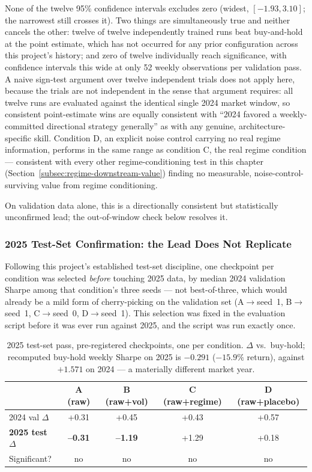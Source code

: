 None of the twelve 95\% confidence intervals excludes zero (widest, $[-1.93, 3.10]$; the narrowest still crosses it). Two things are simultaneously true and neither cancels the other: twelve of twelve independently trained runs beat buy-and-hold at the point estimate, which has not occurred for any prior configuration across this project's history; and zero of twelve individually reach significance, with confidence intervals this wide at only 52 weekly observations per validation pass. A naive sign-test argument over twelve independent trials does not apply here, because the trials are not independent in the sense that argument requires: all twelve runs are evaluated against the identical single 2024 market window, so consistent point-estimate wins are equally consistent with ``2024 favored a weekly-committed directional strategy generally'' as with any genuine, architecture-specific skill. Condition D, an explicit noise control carrying no real regime information, performs in the same range as condition C, the real regime condition --- consistent with every other regime-conditioning test in this chapter (Section~\ref{subsec:regime-downstream-value}) finding no measurable, noise-control-surviving value from regime conditioning.

On validation data alone, this is a directionally consistent but statistically unconfirmed lead; the out-of-window check below resolves it.

\subsubsection{2025 Test-Set Confirmation: the Lead Does Not Replicate}
\label{subsubsec:rl-weekly-2025}

Following this project's established test-set discipline, one checkpoint per condition was selected \emph{before} touching 2025 data, by median 2024 validation Sharpe among that condition's three seeds --- not best-of-three, which would already be a mild form of cherry-picking on the validation set (A$\to$seed~1, B$\to$seed~1, C$\to$seed~0, D$\to$seed~1). This selection was fixed in the evaluation script before it was ever run against 2025, and the script was run exactly once.

\begin{table}[H]
\centering
\small
\caption{2025 test-set pass, pre-registered checkpoints, one per condition. $\Delta$ vs.\ buy-hold; recomputed buy-hold weekly Sharpe on 2025 is $-0.291$ ($-15.9\%$ return), against $+1.571$ on 2024 --- a materially different market year.}
\label{tab:rl-weekly-2025}
\begin{tabular}{|l|c|c|c|c|}
\hline
 & \textbf{A (raw)} & \textbf{B (raw+vol)} & \textbf{C (raw+regime)} & \textbf{D (raw+placebo)} \\
\hline
2024 val $\Delta$ & +0.31 & +0.45 & +0.43 & +0.57 \\
\hline
\textbf{2025 test $\Delta$} & \textbf{--0.31} & \textbf{--1.19} & +1.29 & +0.18 \\
\hline
Significant? & no & no & no & no \\
\hline
\end{tabular}
\normalsize
\end{table}


